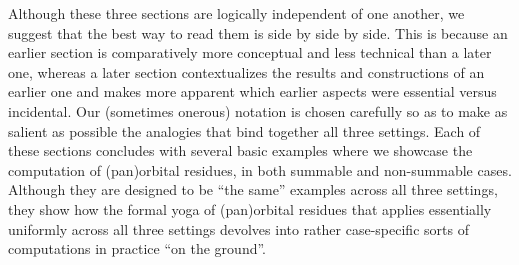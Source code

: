 \documentclass[preprint,12pt]{elsarticle}
\numberwithin{equation}{section} %
\theoremstyle{theorem}
\theoremstyle{definition}
\begin{document}
Although these three sections are logically independent of one another, we suggest that the best way to read them is side by side by side. This is because an earlier section is comparatively more conceptual and less technical than a later one, whereas a later section contextualizes the results and constructions of an earlier one and makes more apparent which earlier aspects were essential versus incidental. Our (sometimes onerous) notation is chosen carefully so as to make as salient as possible the analogies that bind together all three settings. %
Each of these sections concludes with several basic examples where we showcase the computation of (pan)orbital residues, in both summable and non-summable cases. Although they are designed to be ``the same'' examples across all three settings, they show how the formal yoga of (pan)orbital residues that applies essentially uniformly across all three settings devolves into rather case-specific sorts of computations in practice ``on the ground''.
\end{document}
